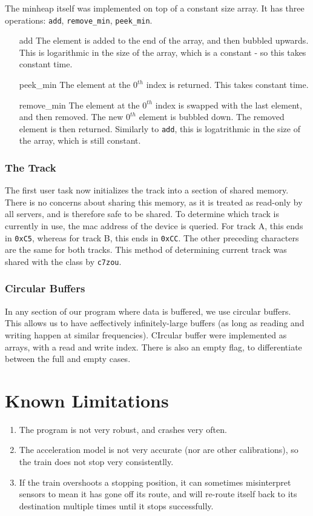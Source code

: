 \documentclass{article}
\begin{document}
    The minheap itself was implemented on top of a constant size array. It has three operations: \verb|add|, \verb|remove_min|, \verb|peek_min|.
\begin{enumerate}
    \item[add] The element is added to the end of the array, and then bubbled upwards. This is logarithmic in the size of the array, which is a constant - so this takes constant time.
    \item[peek\_min] The element at the $0^{th}$ index is returned. This takes constant time.
    \item[remove\_min] The element at the $0^{th}$ index is swapped with the last element, and then removed. The new $0^{th}$ element is bubbled down. The removed element is then returned.
    Similarly to \verb|add|, this is logatrithmic in the size of the array, which is still constant.
\end{enumerate}

\subsubsection{The Track}
    The first user task now initializes the track into a section of shared memory. There is no concerns about sharing this memory, as it is treated as read-only by all servers, and is therefore safe to be shared. 
    To determine which track is currently in use, the mac address of the device is queried. For track A, this ends in \texttt{0xC5}, whereas for track B, this ends in \texttt{0xCC}. 
    The other preceding characters are the same for both tracks. 
    This method of determining current track was shared with the class by \verb|c7zou|.

\subsubsection{Circular Buffers}
    In any section of our program where data is buffered, we use circular buffers. This allows us to have aeffectively infinitely-large buffers (as long as reading and writing happen at similar frequencies). CIrcular buffer were implemented as arrays, with a read and write index. There is also an empty flag, to differentiate between the full and empty cases.

\section{Known Limitations}
\begin{enumerate}
\item The program is not very robust, and crashes very often.
\item The acceleration model is not very accurate (nor are other calibrations), so the train does not stop very consistentlly.
\item If the train overshoots a stopping position, it can sometimes misinterpret sensors to mean it has gone off its route, and will re-route itself back to its destination multiple times until it stops successfully.

\end{enumerate}
\end{document}
